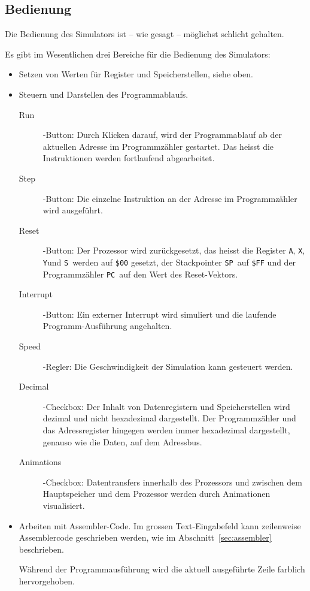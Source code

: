 \documentclass[11pt]{scrartcl}
\newcommand{\xreg}{\texttt{X}}
\newcommand{\yreg}{\texttt{Y}}
\newcommand{\acc}{\texttt{A}}
\newcommand{\stp}{\texttt{SP}}
\newcommand{\sreg}{\texttt{S}}
\newcommand{\pc}{\texttt{PC}}
\newcommand{\hex}[1]{\texttt{\$#1}}
\begin{document}
\subsection{Bedienung}
\label{sec:bedienung}

Die Bedienung des Simulators ist -- wie gesagt -- möglichst schlicht
gehalten.

Es gibt im Wesentlichen drei Bereiche für die Bedienung des
Simulators: 

\begin{itemize}
\item Setzen von Werten für Register und Speicherstellen, siehe oben.
\item Steuern und Darstellen des Programmablaufs.
  \begin{description}
  \item[Run]-Button: Durch Klicken darauf, wird der Programmablauf ab
    der aktuellen Adresse im Programmzähler gestartet. Das heisst die
    Instruktionen werden fortlaufend abgearbeitet.
  \item[Step]-Button: Die einzelne Instruktion an der Adresse im
    Programmzähler wird ausgeführt.
  \item[Reset]-Button: Der Prozessor wird zurückgesetzt, das heisst
    die Register \acc, \xreg, \yreg und \sreg\ werden auf \hex{00}
    gesetzt, der Stackpointer \stp\ auf \hex{FF} und der
    Programmzähler \pc\ auf den Wert des Reset-Vektors.
  \item[Interrupt]-Button: Ein externer Interrupt wird simuliert und
    die laufende Programm-Ausführung angehalten.
  \item[Speed]-Regler: Die Geschwindigkeit der Simulation kann
    gesteuert werden.
  \item[Decimal]-Checkbox: Der Inhalt von Datenregistern und
    Speicherstellen wird dezimal und nicht hexadezimal
    dargestellt.
    Der Programmzähler und das Adressregister hingegen werden immer
    hexadezimal dargestellt, genauso wie die Daten, auf dem Adressbus.
  \item[Animations]-Checkbox: Datentransfers innerhalb des Prozessors
    und zwischen dem Hauptspeicher und dem Prozessor werden durch
    Animationen visualisiert.
  \end{description}
\item Arbeiten mit Assembler-Code.
  Im grossen Text-Eingabefeld kann zeilenweise Assemblercode
  geschrieben werden, wie im Abschnitt~\ref{sec:assembler}
  beschrieben.
  
  Während der Programmausführung wird die aktuell ausgeführte Zeile
  farblich hervorgehoben.


\end{itemize}
\end{document}
